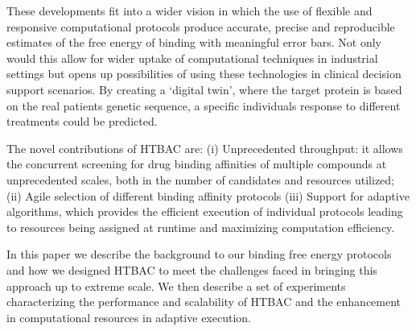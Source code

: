 These developments fit into a wider vision in which the use of
flexible and responsive computational protocols produce accurate,
precise and reproducible estimates of the free energy of binding with 
meaningful error bars. Not only would this allow for wider uptake of 
computational techniques in industrial settings but opens up possibilities 
of using these technologies in clinical decision support scenarios. By creating 
a `digital twin', where the target protein is based on the real patients 
genetic sequence, a specific individuals response to different 
treatments could be predicted. 


The novel contributions of HTBAC are: (i) Unprecedented throughput: it allows
the concurrent screening for drug binding affinities of multiple compounds at
unprecedented scales, both in the number of candidates and resources utilized;
(ii) Agile selection of different binding affinity protocols
(iii) Support for adaptive algorithms, which provides the
efficient execution of individual protocols leading to resources being assigned
at runtime and maximizing computation efficiency. 



In this paper we describe the background to our binding free energy protocols
and how we designed HTBAC to meet the challenges faced in bringing this
approach up to extreme scale. We then describe a set of experiments
characterizing the performance and scalability of HTBAC and the enhancement in 
computational resources in adaptive execution. 

